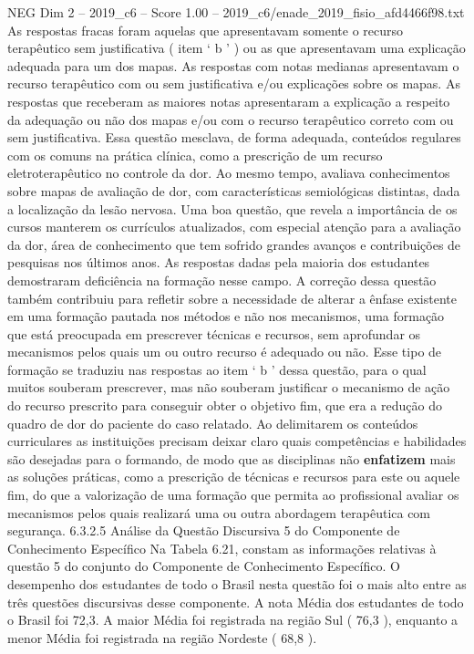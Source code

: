 \begin{textsample}{NEG Dim 2 – 2019\_c6 – Score 1.00 – 2019\_c6/enade\_2019\_fisio\_afd4466f98.txt}
As respostas fracas foram aquelas que apresentavam somente o recurso terapêutico sem justificativa ( item ‘ b ’ ) ou as que apresentavam uma explicação adequada para um dos mapas.
As respostas com notas medianas apresentavam o recurso terapêutico com ou sem justificativa e/ou explicações sobre os mapas.
As respostas que receberam as maiores notas apresentaram a explicação a respeito da adequação ou não dos mapas e/ou com o recurso terapêutico correto com ou sem justificativa.
Essa questão mesclava, de forma adequada, conteúdos regulares com os comuns na prática clínica, como a prescrição de um recurso eletroterapêutico no controle da dor.
Ao mesmo tempo, avaliava conhecimentos sobre mapas de avaliação de dor, com características semiológicas distintas, dada a localização da lesão nervosa.
Uma boa questão, que revela a importância de os cursos manterem os currículos atualizados, com especial atenção para a avaliação da dor, área de conhecimento que tem sofrido grandes avanços e contribuições de pesquisas nos últimos anos.
As respostas dadas pela maioria dos estudantes demostraram deficiência na formação nesse campo.
A correção dessa questão também contribuiu para refletir sobre a necessidade de alterar a ênfase existente em uma formação pautada nos métodos e não nos mecanismos, uma formação que está preocupada em prescrever técnicas e recursos, sem aprofundar os mecanismos pelos quais um ou outro recurso é adequado ou não.
Esse tipo de formação se traduziu nas respostas ao item ‘ b ’ dessa questão, para o qual muitos souberam prescrever, mas não souberam justificar o mecanismo de ação do recurso prescrito para conseguir obter o objetivo fim, que era a redução do quadro de dor do paciente do caso relatado.
Ao delimitarem os conteúdos curriculares as instituições precisam deixar claro quais competências e habilidades são desejadas para o formando, de modo que as disciplinas não \textbf{enfatizem} mais as soluções práticas, como a prescrição de técnicas e recursos para este ou aquele fim, do que a valorização de uma formação que permita ao profissional avaliar os mecanismos pelos quais realizará uma ou outra abordagem terapêutica com segurança. 6.3.2.5 Análise da Questão Discursiva 5 do Componente de Conhecimento Específico Na Tabela 6.21, constam as informações relativas à questão 5 do conjunto do Componente de Conhecimento Específico.
O desempenho dos estudantes de todo o Brasil nesta questão foi o mais alto entre as três questões discursivas desse componente.
A nota Média dos estudantes de todo o Brasil foi 72,3.
A maior Média foi registrada na região Sul ( 76,3 ), enquanto a menor Média foi registrada na região Nordeste ( 68,8 ).

\end{textsample}
